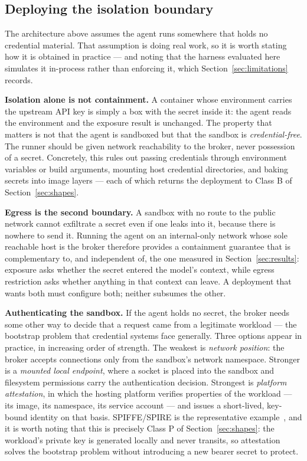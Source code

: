 \documentclass[conference]{IEEEtran}
\begin{document}
\subsection{Deploying the isolation boundary}
\label{subsec:deployment}

The architecture above assumes the agent runs somewhere that holds no
credential material. That assumption is doing real work, so it is worth stating
how it is obtained in practice --- and noting that the harness evaluated here
simulates it in-process rather than enforcing it, which
Section~\ref{sec:limitations} records.

\textbf{Isolation alone is not containment.} A container whose environment
carries the upstream API key is simply a box with the secret inside it: the
agent reads the environment and the exposure result is unchanged. The property
that matters is not that the agent is sandboxed but that the sandbox is
\emph{credential-free}. The runner should be given network reachability to the
broker, never possession of a secret. Concretely, this rules out passing
credentials through environment variables or build arguments, mounting host
credential directories, and baking secrets into image layers --- each of which
returns the deployment to Class B of Section~\ref{sec:shapes}.

\textbf{Egress is the second boundary.} A sandbox with no route to the public
network cannot exfiltrate a secret even if one leaks into it, because there is
nowhere to send it. Running the agent on an internal-only network whose sole
reachable host is the broker therefore provides a containment guarantee that is
complementary to, and independent of, the one measured in
Section~\ref{sec:results}: exposure asks whether the secret entered the model's
context, while egress restriction asks whether anything in that context can
leave. A deployment that wants both must configure both; neither subsumes the
other.

\textbf{Authenticating the sandbox.} If the agent holds no secret, the broker
needs some other way to decide that a request came from a legitimate workload
--- the bootstrap problem that credential systems face generally. Three options
appear in practice, in increasing order of strength. The weakest is
\emph{network position}: the broker accepts connections only from the sandbox's
network namespace. Stronger is a \emph{mounted local endpoint}, where a socket
is placed into the sandbox and filesystem permissions carry the authentication
decision. Strongest is \emph{platform attestation}, in which the hosting
platform verifies properties of the workload --- its image, its namespace, its
service account --- and issues a short-lived, key-bound identity on that basis.
SPIFFE/SPIRE is the representative example~\cite{spiffe}, and it is worth
noting that this is precisely Class P of Section~\ref{sec:shapes}: the
workload's private key is generated locally and never transits, so attestation
solves the bootstrap problem without introducing a new bearer secret to protect.
\end{document}
